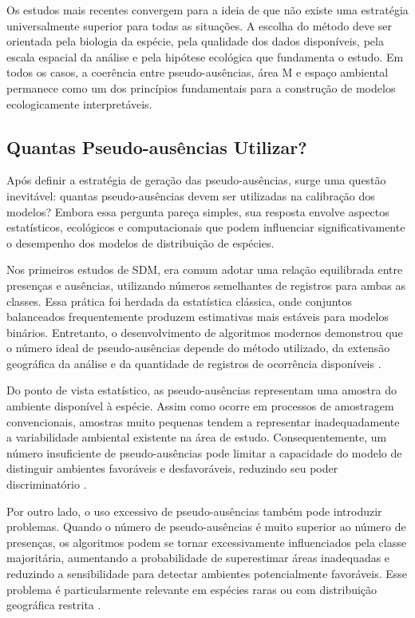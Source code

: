 Os estudos mais recentes convergem para a ideia de que não existe uma estratégia universalmente superior para todas as situações. A escolha do método deve ser orientada pela biologia da espécie, pela qualidade dos dados disponíveis, pela escala espacial da análise e pela hipótese ecológica que fundamenta o estudo. Em todos os casos, a coerência entre pseudo-ausências, área M e espaço ambiental permanece como um dos princípios fundamentais para a construção de modelos ecologicamente interpretáveis.

\subsection{Quantas Pseudo-ausências Utilizar?}

Após definir a estratégia de geração das pseudo-ausências, surge uma questão inevitável: quantas pseudo-ausências devem ser utilizadas na calibração dos modelos? Embora essa pergunta pareça simples, sua resposta envolve aspectos estatísticos, ecológicos e computacionais que podem influenciar significativamente o desempenho dos modelos de distribuição de espécies.

Nos primeiros estudos de SDM, era comum adotar uma relação equilibrada entre presenças e ausências, utilizando números semelhantes de registros para ambas as classes. Essa prática foi herdada da estatística clássica, onde conjuntos balanceados frequentemente produzem estimativas mais estáveis para modelos binários. Entretanto, o desenvolvimento de algoritmos modernos demonstrou que o número ideal de pseudo-ausências depende do método utilizado, da extensão geográfica da análise e da quantidade de registros de ocorrência disponíveis \citep{pearce2000evaluating}.

Do ponto de vista estatístico, as pseudo-ausências representam uma amostra do ambiente disponível à espécie. Assim como ocorre em processos de amostragem convencionais, amostras muito pequenas tendem a representar inadequadamente a variabilidade ambiental existente na área de estudo. Consequentemente, um número insuficiente de pseudo-ausências pode limitar a capacidade do modelo de distinguir ambientes favoráveis e desfavoráveis, reduzindo seu poder discriminatório \citep{franklin2010mapping}.

Por outro lado, o uso excessivo de pseudo-ausências também pode introduzir problemas. Quando o número de pseudo-ausências é muito superior ao número de presenças, os algoritmos podem se tornar excessivamente influenciados pela classe majoritária, aumentando a probabilidade de superestimar áreas inadequadas e reduzindo a sensibilidade para detectar ambientes potencialmente favoráveis. Esse problema é particularmente relevante em espécies raras ou com distribuição geográfica restrita \citep{barbet2012selecting}.

